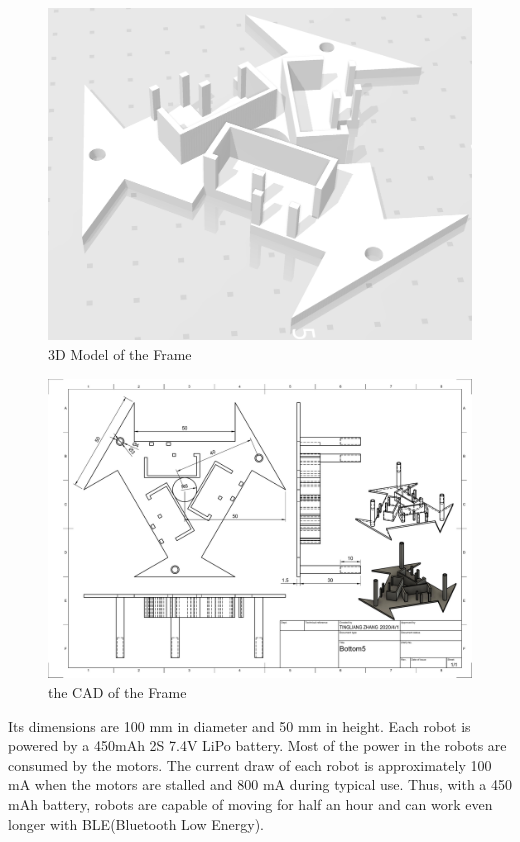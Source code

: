 \documentclass[sigconf]{acmart}
\begin{document}
\begin{figure}[h]
  \centering
  \includegraphics[width=\linewidth]{Frame.png}
  \caption{3D Model of the Frame}
  \label{fig:Frame}
\end{figure}

\begin{figure}[h]
  \centering
  \includegraphics[width=\linewidth]{Bottom.pdf}
  \caption{the CAD of the Frame}
  \label{fig:CAD}
\end{figure}

Its dimensions are 100 mm in diameter and 50 mm in height. Each robot is powered by a 450mAh 2S 7.4V LiPo battery. Most of the power in the robots are consumed by the motors. The current draw of each robot is approximately 100 mA when the motors are stalled and 800 mA during typical use. Thus, with a 450 mAh battery, robots are capable of moving for half an hour and can work even longer with BLE(Bluetooth Low Energy). 
\end{document}
